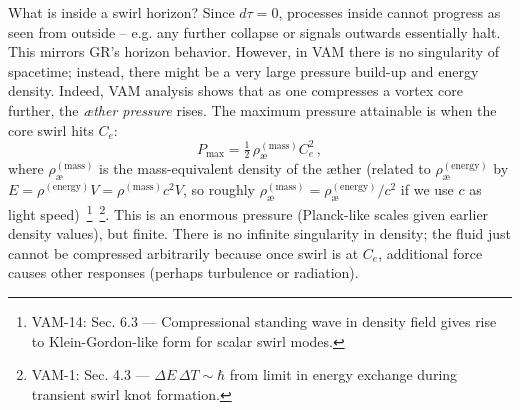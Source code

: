 \documentclass[a4paper,12pt]{article}
\begin{document}
    What is inside a swirl horizon? Since $d\tau=0$, processes inside cannot progress as seen from outside – e.g. any further collapse or signals outwards essentially halt. This mirrors GR’s horizon behavior. However, in VAM there is no singularity of spacetime; instead, there might be a very large pressure build-up and energy density. Indeed, VAM analysis shows that as one compresses a vortex core further, the \emph{æther pressure} rises. The maximum pressure attainable is when the core swirl hits $C_e$:
    \begin{equation}
        P_{\max} = \tfrac{1}{2}\,\rho_{\text{\ae}}^{(\text{mass})} C_e^2\,,
        \label{eq:Pmax}
    \end{equation}
    where $\rho_{\text{\ae}}^{(\text{mass})}$ is the mass-equivalent density of the æther (related to $\rho_{\text{\ae}}^{(\text{energy})}$ by $E=\rho^{(\text{energy})}V = \rho^{(\text{mass})} c^2 V$, so roughly $\rho^{(\text{mass})}_{\text{\ae}} = \rho^{(\text{energy})}_{\text{\ae}}/c^2$ if we use $c$ as light speed)~\footnote{VAM-14: Sec. 6.3 — Compressional standing wave in density field gives rise to Klein-Gordon-like form for scalar swirl modes.}~\footnote{VAM-1: Sec. 4.3 — $\Delta E \, \Delta T \sim \hbar$ from limit in energy exchange during transient swirl knot formation.}. This is an enormous pressure (Planck-like scales given earlier density values), but finite. There is no infinite singularity in density; the fluid just cannot be compressed arbitrarily because once swirl is at $C_e$, additional force causes other responses (perhaps turbulence or radiation).
\end{document}
